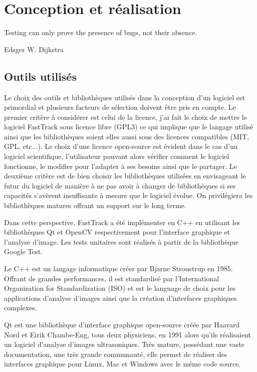 \chapter{Conception et réalisation}

    \epigraph{Testing can only prove the presence of bugs, not their absence.}{Edsger W. Dijkstra}

	\section{Outils utilisés}
	
	Le choix des outils et bibliothèques utilisés dans la conception d'un logiciel est primordial et plusieurs facteurs de sélection doivent être pris en compte.
	Le premier critère à considérer est celui de la licence, j'ai fait le choix de mettre le logiciel FastTrack sous licence libre (GPL3) ce qui implique que le langage utilisé ainsi que les bibliothèques soient elles aussi sous des licences compatibles (MIT, GPL, etc...). Le choix d'une licence open-source est évident dans le cas d'un logiciel scientifique, l'utilisateur pouvant alors vérifier comment le logiciel fonctionne, le modifier pour l'adapter à ses besoins ainsi que le partager.
	Le deuxième critère est de bien choisir les bibliothèques utilisées en envisageant le futur du logiciel de manière à ne pas avoir à changer de bibliothèques si ses capacités s'avèrent insuffisante à mesure que le logiciel évolue. On privilégiera les bibliothèques matures offrant un support sur le long terme.
\medbreak
	
	Dans cette perspective, FastTrack a été implémenter en C++ \cite{C++} en utilisant les bibliothèques Qt \cite{Qt} et OpenCV \cite{opencv_library} respectivement pour l'interface graphique et l'analyse d'image. Les tests unitaires sont réalisés à partir de la bibliothèque Google Test.
\medbreak
	
	Le C++ est un langage informatique créer par Bjarne Stroustrup en 1985. Offrant de grandes performances, il est standardisé par l'International Organization for Standardization (ISO) et est le language de choix pour les applications d'analyse d'images ainsi que la création d'interfaces graphiques complexes.
\medbreak
	
	Qt est une bibliothèque d'interface graphique open-source créée par Haavard Nord et Eirik Chambe-Eng, tous deux physiciens, en 1991 alors qu'ils réalisaient un logiciel d'analyse d'images ultrasoniques. Très mature, possédant une vaste documentation, une très grande communauté, elle permet de réaliser des interfaces graphique pour Linux, Mac et Windows avec le même code source.
\medbreak
	
